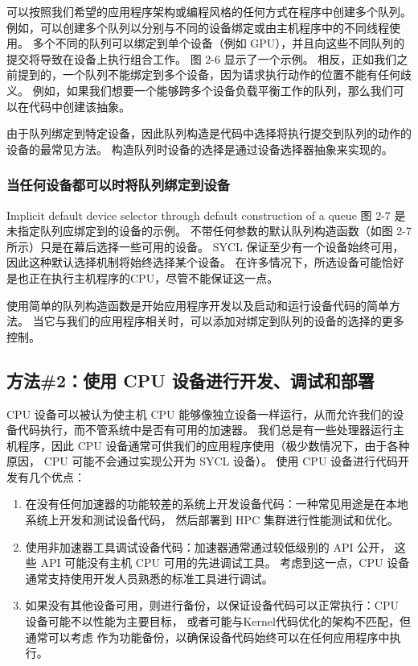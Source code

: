 可以按照我们希望的应用程序架构或编程风格的任何方式在程序中创建多个队列。 
例如，可以创建多个队列以分别与不同的设备绑定或由主机程序中的不同线程使用。 
多个不同的队列可以绑定到单个设备（例如 GPU），并且向这些不同队列的提交将导致在设备上执行组合工作。 
图 2-6 显示了一个示例。 相反，正如我们之前提到的，一个队列不能绑定到多个设备，因为请求执行动作的位置不能有任何歧义。 
例如，如果我们想要一个能够跨多个设备负载平衡工作的队列，那么我们可以在代码中创建该抽象。

由于队列绑定到特定设备，因此队列构造是代码中选择将执行提交到队列的动作的设备的最常见方法。 
构造队列时设备的选择是通过设备选择器抽象来实现的。

\subsubsection{当任何设备都可以时将队列绑定到设备}
{\color{red} Implicit default device selector through default construction of a queue }
图 2-7 是未指定队列应绑定到的设备的示例。 不带任何参数的默认队列构造函数（如图 2-7 所示）只是在幕后选择一些可用的设备。 
SYCL 保证至少有一个设备始终可用，因此这种默认选择机制将始终选择某个设备。 
在许多情况下，所选设备可能恰好是也正在执行主机程序的CPU，尽管不能保证这一点。

使用简单的队列构造函数是开始应用程序开发以及启动和运行设备代码的简单方法。 
当它与我们的应用程序相关时，可以添加对绑定到队列的设备的选择的更多控制。

\subsection{方法\#2：使用 CPU 设备进行开发、调试和部署}
CPU 设备可以被认为使主机 CPU 能够像独立设备一样运行，从而允许我们的设备代码执行，而不管系统中是否有可用的加速器。 
我们总是有一些处理器运行主机程序，因此 CPU 设备通常可供我们的应用程序使用（极少数情况下，由于各种原因，
CPU 可能不会通过实现公开为 SYCL 设备）。 使用 CPU 设备进行代码开发有几个优点：

\begin{enumerate}
	\item 在没有任何加速器的功能较差的系统上开发设备代码：一种常见用途是在本地系统上开发和测试设备代码，
	然后部署到 HPC 集群进行性能测试和优化。

	\item 使用非加速器工具调试设备代码：加速器通常通过较低级别的 API 公开，
	这些 API 可能没有主机 CPU 可用的先进调试工具。 考虑到这一点，CPU 设备通常支持使用开发人员熟悉的标准工具进行调试。

	\item 如果没有其他设备可用，则进行备份，以保证设备代码可以正常执行：CPU 设备可能不以性能为主要目标，
	或者可能与Kernel代码优化的架构不匹配，但通常可以考虑 作为功能备份，以确保设备代码始终可以在任何应用程序中执行。
\end{enumerate}

